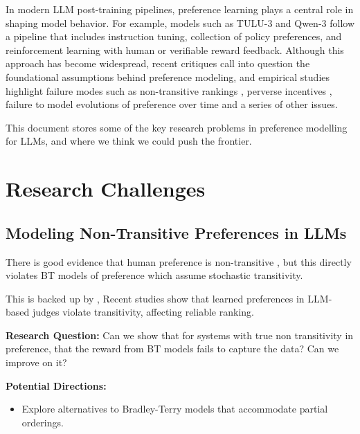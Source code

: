 \documentclass[sigconf]{acmart}
\begin{document}
In modern LLM post-training pipelines, preference learning plays a central role in shaping model behavior. 
For example, models such as TULU-3 \cite{tulu3} and Qwen-3 \cite{qwen3} follow a pipeline that includes instruction tuning, collection of policy preferences, and reinforcement learning with human or verifiable reward feedback. Although this approach has become widespread, recent critiques \cite{sun2024rethinking, zhixuan2024beyond} call into question the foundational assumptions behind preference modeling, and empirical studies highlight failure modes such as non-transitive rankings \cite{non_transitivity_llm_evaluators_paper, yu2025elspr}, perverse incentives \cite{xu2023rlhf}, failure to model evolutions of preference over time \cite{temporal_drift} and a series of other issues.

This document stores some of the key research problems in preference modelling for LLMs, and where we think we could push the frontier.

\section{Research Challenges}

\subsection{Modeling Non-Transitive Preferences in LLMs}

There is good evidence that human preference is non-transitive \cite{tversky1969intransitivity}, but this directly violates BT models of preference \cite{foundation_book_on_bt} which assume stochastic transitivity.

This is backed up by \cite{non_transitivity_llm_evaluators_paper}, \cite{tournament_graphs_to_clean_up_non_transitivity}
Recent studies \cite{non_transitivity_llm_evaluators_paper, tournament_graphs_to_clean_up_non_transitivity} show that learned preferences in LLM-based judges violate transitivity, affecting reliable ranking.

\textbf{Research Question:} Can we show that for systems with true non transitivity in preference, that the reward from BT models fails to capture the data? Can we improve on it?

\textbf{Potential Directions:}
\begin{itemize}
    \item Explore alternatives to Bradley-Terry models that accommodate partial orderings.
\end{itemize}
\end{document}
